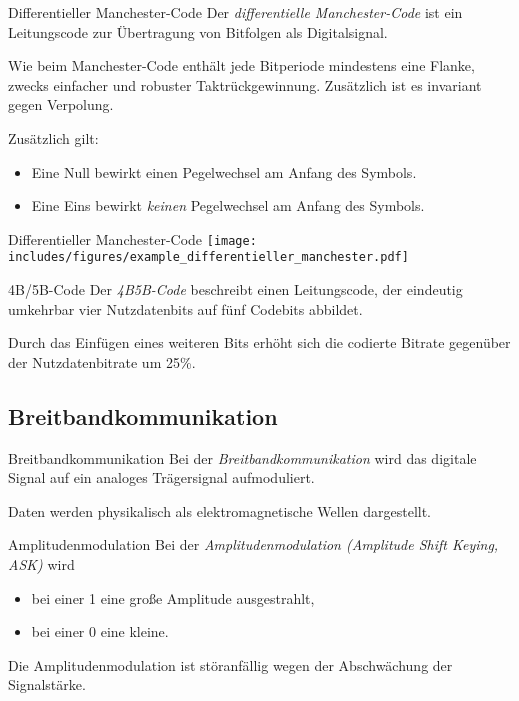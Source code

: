 \begin{defi}{Differentieller Manchester-Code}
    Der \emph{differentielle Manchester-Code} ist ein Leitungscode zur Übertragung von Bitfolgen als Digitalsignal.

    Wie beim Manchester-Code enthält jede Bitperiode mindestens eine Flanke, zwecks einfacher und robuster Taktrückgewinnung.
    Zusätzlich ist es invariant gegen Verpolung.

    Zusätzlich gilt:
    \begin{itemize}
        \item Eine Null bewirkt einen Pegelwechsel am Anfang des Symbols.
        \item Eine Eins bewirkt \emph{keinen} Pegelwechsel am Anfang des Symbols.
    \end{itemize}
\end{defi}

\begin{example}{Differentieller Manchester-Code}
    \centering
    \texttt{[image: includes/figures/example\_differentieller\_manchester.pdf]}
\end{example}

\begin{defi}{4B/5B-Code}
    Der \emph{4B5B-Code} beschreibt einen Leitungscode, der eindeutig umkehrbar vier Nutzdatenbits auf fünf Codebits abbildet.

    Durch das Einfügen eines weiteren Bits erhöht sich die codierte Bitrate gegenüber der Nutzdatenbitrate um 25\%.
\end{defi}

\subsection{Breitbandkommunikation}

\begin{defi}{Breitbandkommunikation}
    Bei der \emph{Breitbandkommunikation} wird das digitale Signal auf ein analoges Trägersignal aufmoduliert.

    Daten werden physikalisch als elektromagnetische Wellen dargestellt.
\end{defi}

\begin{defi}{Amplitudenmodulation}
    Bei der \emph{Amplitudenmodulation (Amplitude Shift Keying, ASK)} wird
    \begin{itemize}
        \item bei einer 1 eine große Amplitude ausgestrahlt,
        \item bei einer 0 eine kleine.
    \end{itemize}

    Die Amplitudenmodulation ist störanfällig wegen der Abschwächung der Signalstärke.
\end{defi}

